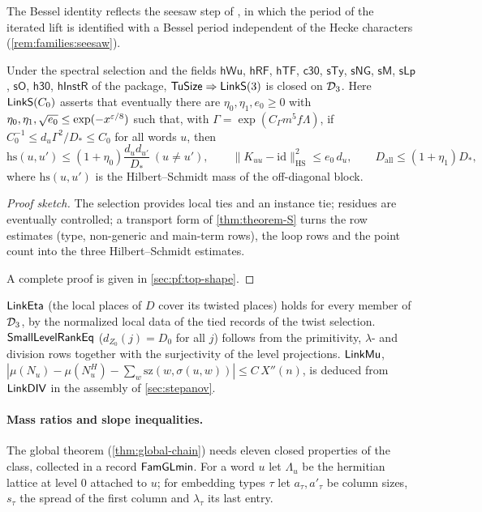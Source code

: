 The Bessel identity reflects the seesaw step of \cite{Announcement2026}, in which the period of the iterated lift
is identified with a Bessel period independent of the Hecke characters (\cref{rem:families:seesaw}).

\begin{corollary}\Fmark\label{cor:families:linkS}
Under the spectral selection and the fields $\mathsf{hWu}$, $\mathsf{hRF}$, $\mathsf{hTF}$, $\mathsf{c30}$,
$\mathsf{sTy}$, $\mathsf{sNG}$, $\mathsf{sM}$, $\mathsf{sLp}$, $\mathsf{sO}$, $\mathsf{h30}$, $\mathsf{hInstR}$ of
the package, $\mathsf{TuSize}\Rightarrow\mathsf{LinkS}(3)$ is closed on $\mathcal{D}_3$. Here
$\mathsf{LinkS}(C_0)$ asserts that eventually there are $\eta_0,\eta_1,e_0\ge0$ with
$\eta_0,\eta_1,\sqrt{e_0}\le\exp(-x^{\varepsilon/8})$ such that, with $\Gamma=\exp(C_\Gamma m^5f\Lambda)$, if
$C_0^{-1}\le d_u\Gamma^2/D_*\le C_0$ for all words $u$, then
\[
\mathrm{hs}(u,u')\le(1+\eta_0)\frac{d_ud_{u'}}{D_*}\ (u\ne u'),\qquad
\|K_{uu}-\mathrm{id}\|_{\mathrm{HS}}^2\le e_0\,d_u,\qquad D_{\mathrm{all}}\le(1+\eta_1)D_*,
\]
where $\mathrm{hs}(u,u')$ is the Hilbert--Schmidt mass of the off-diagonal block.
\end{corollary}

\begin{proof}[Proof sketch]
The selection provides local ties and an instance tie; residues are eventually controlled; a transport form of
\cref{thm:theorem-S} turns the row estimates (type, non-generic and main-term rows), the loop rows and the point
count into the three Hilbert--Schmidt estimates.

A complete proof is given in \cref{sec:pf:top-shape}.
\end{proof}

\begin{remark}\label{rem:families:small}
$\mathsf{LinkEta}$ (the local places of $D$ cover its twisted places) holds for every member of $\mathcal{D}_3$,
by the normalized local data of the tied records of the twist selection. $\mathsf{SmallLevelRankEq}$
($d_{Z_0}(j)=D_0$ for all $j$) follows from the primitivity, $\lambda$- and division rows together with the
surjectivity of the level projections. $\mathsf{LinkMu}$,
$|\mu(N_u)-\mu(N^H_u)-\sum_w\mathrm{sz}(w,\sigma(u,w))|\le C\,X''(n)$, is deduced from $\mathsf{LinkDIV}$ in the
assembly of \cref{sec:stepanov}.
\end{remark}

\paragraph{Mass ratios and slope inequalities.}
The global theorem (\cref{thm:global-chain}) needs eleven closed properties of the class, collected in a record
$\mathsf{FamGLmin}$. For a word $u$ let $\Lambda_u$ be the hermitian lattice at level $0$ attached to $u$; for
embedding types $\tau$ let $a_\tau,a'_\tau$ be column sizes, $s_\tau$ the spread of the first column and
$\lambda_\tau$ its last entry.

